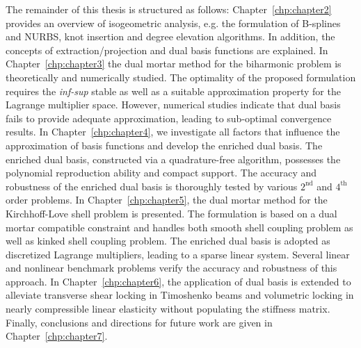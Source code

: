 The remainder of this thesis is structured as follows: Chapter~\ref{chp:chapter2} provides an overview of isogeometric analysis, e.g. the formulation of B-splines and NURBS, knot insertion and degree elevation algorithms. In addition, the concepts of \Bezier extraction/projection and dual basis functions are explained. In Chapter~\ref{chp:chapter3} the \Bezier dual mortar method for the biharmonic problem is theoretically and numerically studied. The optimality of the proposed formulation requires the \textit{inf-sup} stable as well as a suitable approximation property for the Lagrange multiplier space. However, numerical studies indicate that \Bezier dual basis fails to provide adequate approximation, leading to sub-optimal convergence results. In Chapter~\ref{chp:chapter4}, we investigate all factors that influence the approximation of basis functions and develop the enriched \Bezier dual basis. The enriched \Bezier dual basis, constructed via a quadrature-free algorithm, possesses the polynomial reproduction ability and compact support. The accuracy and robustness of the enriched \Bezier dual basis is thoroughly tested by various $2^\text{nd}$ and $4^\text{th}$ order problems. In Chapter~\ref{chp:chapter5}, the \Bezier dual mortar method for the Kirchhoff-Love shell problem is presented. The formulation is based on a dual mortar compatible constraint and handles both smooth shell coupling problem as well as kinked shell coupling problem. The enriched \Bezier dual basis is adopted as discretized Lagrange multipliers, leading to a sparse linear system. Several linear and nonlinear benchmark problems verify the accuracy and robustness of this approach. In Chapter~\ref{chp:chapter6}, the application of \Bezier dual basis is extended to alleviate transverse shear locking in Timoshenko beams and volumetric locking in nearly compressible linear elasticity without populating the stiffness matrix. Finally, conclusions and directions for future work are given in Chapter~\ref{chp:chapter7}.